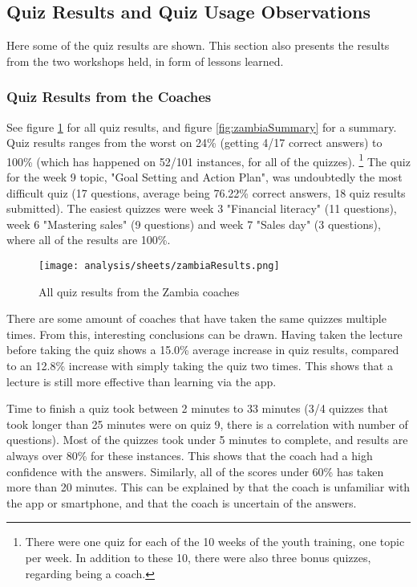 \subsection{Quiz Results and Quiz Usage Observations}


    Here some of the quiz results are shown. This section also presents the results from the two workshops held, in form of lessons learned.

    \subsubsection{Quiz Results from the Coaches}

    See figure \ref{fig:zambiaResults} for all quiz results, and figure \ref{fig:zambiaSummary} for a summary. Quiz results ranges from the worst on 24\% (getting 4/17 correct answers) to 100\% (which has happened on 52/101 instances, for all of the quizzes). \footnote{There were one quiz for each of the 10 weeks of the youth training, one topic per week. In addition to these 10, there were also three bonus quizzes, regarding being a coach.} The quiz for the week 9 topic, "Goal Setting and Action Plan", was undoubtedly the most difficult quiz (17 questions, average being 76.22\% correct answers, 18 quiz results submitted). The easiest quizzes were week 3 "Financial literacy" (11 questions), week 6 "Mastering sales" (9 questions) and week 7 "Sales day" (3 questions), where all of the results are 100\%.

    \begin{figure}[h]
        \centering
        \texttt{[image: analysis/sheets/zambiaResults.png]}
        \caption{All quiz results from the Zambia coaches}
        \label{fig:zambiaResults}
    \end{figure}

    \clearpage

    There are some amount of coaches that have taken the same quizzes multiple times. From this, interesting conclusions can be drawn. Having taken the lecture before taking the quiz shows a 15.0\% average increase in quiz results, compared to an 12.8\% increase with simply taking the quiz two times. This shows that a lecture is still more effective than learning via the app.

    Time to finish a quiz took between 2 minutes to 33 minutes (3/4 quizzes that took longer than 25 minutes were on quiz 9, there is a correlation with number of questions). Most of the quizzes took under 5 minutes to complete, and results are always over 80\% for these instances. This shows that the coach had a high confidence with the answers. Similarly, all of the scores under 60\% has taken more than 20 minutes. This can be explained by that the coach is unfamiliar with the app or smartphone, and that the coach is uncertain of the answers.

